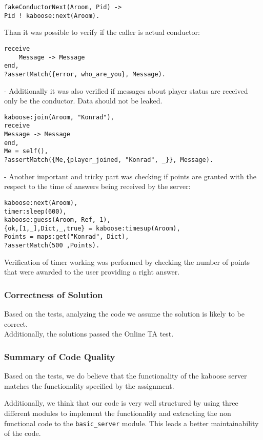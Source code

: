 \documentclass[11pt, a4paper]{article}
\begin{document}
\begin{verbatim}
fakeConductorNext(Aroom, Pid) ->
Pid ! kaboose:next(Aroom). 
\end{verbatim}

\noindent Than it was possible to verify if the caller is actual conductor:

\begin{verbatim}
receive 
	Message -> Message
end,
?assertMatch({error, who_are_you}, Message).
\end{verbatim}

\noindent- Additionally it was also verified if messages about player status are received only be the conductor. Data should not be leaked. 

\begin{verbatim}
kaboose:join(Aroom, "Konrad"),
receive 
Message -> Message
end,
Me = self(),
?assertMatch({Me,{player_joined, "Konrad", _}}, Message).
\end{verbatim}

\noindent - Another important and tricky part was checking if points are granted with the respect to the time of answers being received by the server:

\begin{verbatim}
kaboose:next(Aroom),
timer:sleep(600),
kaboose:guess(Aroom, Ref, 1),
{ok,[1,_],Dict,_,true} = kaboose:timesup(Aroom),
Points = maps:get("Konrad", Dict),
?assertMatch(500 ,Points).
\end{verbatim}
Verification of timer working was performed by checking the number of points that were awarded to the user providing a right answer. 

\subsubsection{Correctness of Solution}
Based on the tests, analyzing the code we assume the solution is likely to be correct.
\\
Additionally, the solutions passed the Online TA test.

\subsubsection{Summary of Code Quality}
Based on the tests, we do believe that the functionality of the kaboose server matches the functionality specified by the assignment.

Additionally, we think that our code is very well structured by using three different modules to implement the functionality and extracting the non functional code to the \texttt{basic\_server} module. This leads a better maintainability of the code.
\end{document}
